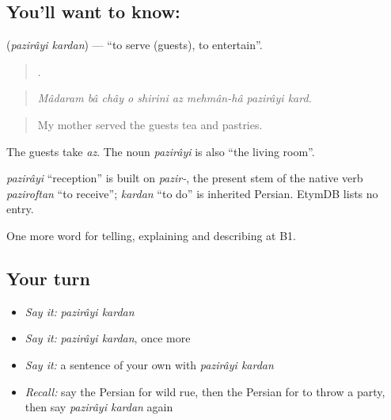 \subsection*{You'll want to know:  }
\textbf{ } (\emph{pazirâyi kardan}) — \textquotedblleft{}to serve (guests), to entertain\textquotedblright{}.

\begin{quote}
        .
\end{quote}

\begin{quote}
\emph{Mâdaram bâ chây o shirini az mehmân-hâ pazirâyi kard.}
\end{quote}

\begin{quote}
My mother served the guests tea and pastries.
\end{quote}

The guests take \emph{az}. The noun \emph{pazirâyi} is also \textquotedblleft{}the living room\textquotedblright{}.

\begin{cousinweb}
\emph{pazirâyi} \textquotedblleft{}reception\textquotedblright{} is built on \emph{pazir-}, the present stem of the native verb \emph{paziroftan} \textquotedblleft{}to receive\textquotedblright{}; \emph{kardan} \textquotedblleft{}to do\textquotedblright{} is inherited Persian. EtymDB lists no entry.
\end{cousinweb}

\begin{grammarlens}[title={What you've built}]
One more word for telling, explaining and describing at B1.
\end{grammarlens}

\subsection*{Your turn}
\begin{itemize}
\raggedright
  \item \emph{Say it:} \emph{pazirâyi kardan}
  \item \emph{Say it:} \emph{pazirâyi kardan}, once more
  \item \emph{Say it:} a sentence of your own with \emph{pazirâyi kardan}
  \item \emph{Recall:} say the Persian for wild rue, then the Persian for to throw a party, then say \emph{pazirâyi kardan} again
\end{itemize}

